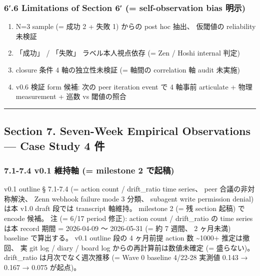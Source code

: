 \documentclass[
]{article}
\providecommand{\tightlist}{%
  \setlength{\itemsep}{0pt}\setlength{\parskip}{0pt}}
\begin{document}
\subsubsection{6′.6 Limitations of Section 6′ (= self-observation bias
明示)}\label{limitations-of-section-6-self-observation-bias-ux660eux793a}

\begin{enumerate}
\def\labelenumi{\arabic{enumi}.}
\tightlist
\item
  N=3 sample (= 成功 2 + 失敗 1) からの post hoc 抽出、 仮閾値の
  reliability 未検証
\item
  「成功」 / 「失敗」 ラベル本人視点依存 (= Zen / Hoshi internal 判定)
\item
  closure 条件 4 軸の独立性未検証 (= 軸間の correlation 軸 audit 未実施)
\item
  v0.6 検証 form 候補: 次の peer iteration event で 4 軸事前 articulate
  + 物理 measurement + 巡数 vs 閾値の照合
\end{enumerate}

\begin{center}\rule{0.5\linewidth}{0.5pt}\end{center}

\subsection{Section 7. Seven-Week Empirical Observations --- Case Study
4
件}\label{section-7.-seven-week-empirical-observations-case-study-4-ux4ef6}

\subsubsection{7.1-7.4 v0.1 維持軸 (= milestone 2
で起稿)}\label{v0.1-ux7dadux6301ux8ef8-milestone-2-ux3067ux8d77ux7a3f}

v0.1 outline § 7.1-7.4 (= action count / drift\_ratio time series、 peer
合議の非対称解決、 Zenn webhook failure mode 3 分類、 subagent write
permission denial) は本 v1.0 draft 段では transcript 軸維持。 milestone
2 (= 残 section 起稿) で encode 候補。 注 (= 6/17 period 修正): action
count / drift\_ratio の time series は本 record 期間 = 2026-04-09 〜
2026-05-31 (= 約 7 週間、 2 ヶ月未満) baseline で算出する。 v0.1 outline
段の 4 ヶ月前提 action 数 \textasciitilde1000+ 推定は撤回、 実 git log /
diary / board log からの再計算前は数値未確定 (= 盛らない)。 drift\_ratio
は月次でなく週次推移 (= Wave 0 baseline 4/22-28 実測値 0.143 → 0.167 →
0.075 が起点)。
\end{document}
